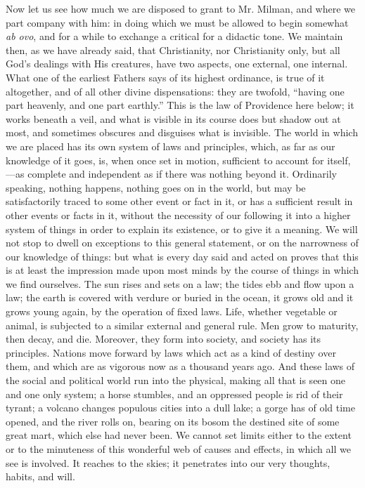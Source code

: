 Now let us see how much we are disposed to grant
to Mr. Milman, and where we part company with him: in doing which we
must be allowed to begin somewhat \emph{ab ovo}, and for a while to
exchange a critical for a didactic tone. We maintain then, as we have
already said, that Christianity, nor Christianity only, but all God's
dealings with His creatures, have two aspects, one external, one
internal. What one of the earliest Fathers says of its highest
ordinance, is true of it altogether, and of all other divine
dispensations: they are twofold, ``having one part heavenly, and one
part earthly.'' This is the law of Providence here below; it works
beneath a veil, and what is visible in its course does but shadow out
at most, and sometimes obscures and disguises what is invisible. The
world in which we are placed has its own system of laws and
principles, which, as far as our knowledge of it goes, is, when once
set in motion, sufficient to account for itself,—as complete and
independent as if there was nothing beyond it. Ordinarily speaking,
nothing happens, nothing goes on in the world, but may be
satisfactorily traced to some other event or fact in it, or has a
sufficient result in other events or facts in it, without the
necessity of our following it into a higher system of things in order
to explain its existence, or to give it a meaning. We will not stop to
dwell on exceptions to this general statement, or on the narrowness of
our knowledge of things: but what is every day said and acted on
proves that this is at least the impression made upon most minds by
the course of things in which we find ourselves. The sun rises and
sets on a law; the tides ebb and flow upon a law; the earth is covered
with verdure or buried in the ocean, it grows old and it grows young
again, by the operation of fixed laws. Life, whether vegetable or
animal, is subjected to a similar external and general rule. Men grow
to maturity, then decay, and die. Moreover, they form into society,
and society has its principles. Nations move forward by laws which act
as a kind of destiny over them, and which are as vigorous now as a
thousand years ago. And these laws of the social and political world
run into the physical, making all that is seen one and one only
system; a horse stumbles, and an oppressed people is rid of their
tyrant; a volcano changes populous cities into a dull lake; a gorge
has of old time opened, and the river rolls on, bearing on its bosom
the destined site of some great mart, which else had never been. We
cannot set limits either to the extent or to the minuteness of this
wonderful web of causes and effects, in which all we see is involved.
It reaches to the skies; it penetrates into our very thoughts,
habits, and will.

